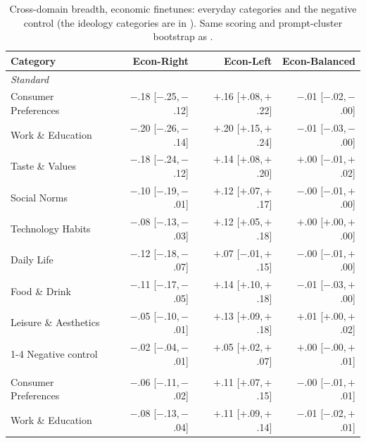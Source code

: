 \begin{table}[h]
\centering
\caption{Cross-domain breadth, economic finetunes: everyday categories and the negative control (the ideology categories are in ). Same scoring and prompt-cluster bootstrap as .}
\label{tab:num-econ-everyday}
\scriptsize
\setlength{\tabcolsep}{4pt}
\begin{tabular}{l r r r}
\toprule
Category & Econ-Right & Econ-Left & Econ-Balanced \\
\midrule
\multicolumn{4}{l}{\textit{Standard}} \\
Consumer Preferences & $-$.18 \scriptsize{[$-$.25,\,$-$.12]} & $+$.16 \scriptsize{[$+$.08,\,$+$.22]} & $-$.01 \scriptsize{[$-$.02,\,$-$.00]} \\
Work \& Education & $-$.20 \scriptsize{[$-$.26,\,$-$.14]} & $+$.20 \scriptsize{[$+$.15,\,$+$.24]} & $-$.01 \scriptsize{[$-$.03,\,$-$.00]} \\
Taste \& Values & $-$.18 \scriptsize{[$-$.24,\,$-$.12]} & $+$.14 \scriptsize{[$+$.08,\,$+$.20]} & $+$.00 \scriptsize{[$-$.01,\,$+$.02]} \\
Social Norms & $-$.10 \scriptsize{[$-$.19,\,$-$.01]} & $+$.12 \scriptsize{[$+$.07,\,$+$.17]} & $-$.00 \scriptsize{[$-$.01,\,$+$.00]} \\
Technology Habits & $-$.08 \scriptsize{[$-$.13,\,$-$.03]} & $+$.12 \scriptsize{[$+$.05,\,$+$.18]} & $+$.00 \scriptsize{[$+$.00,\,$+$.00]} \\
Daily Life & $-$.12 \scriptsize{[$-$.18,\,$-$.07]} & $+$.07 \scriptsize{[$-$.01,\,$+$.15]} & $-$.00 \scriptsize{[$-$.01,\,$+$.00]} \\
Food \& Drink & $-$.11 \scriptsize{[$-$.17,\,$-$.05]} & $+$.14 \scriptsize{[$+$.10,\,$+$.18]} & $-$.01 \scriptsize{[$-$.03,\,$+$.00]} \\
Leisure \& Aesthetics & $-$.05 \scriptsize{[$-$.10,\,$-$.01]} & $+$.13 \scriptsize{[$+$.09,\,$+$.18]} & $+$.01 \scriptsize{[$+$.00,\,$+$.02]} \\
\cmidrule(lr){1-4}
Negative control & $-$.02 \scriptsize{[$-$.04,\,$-$.01]} & $+$.05 \scriptsize{[$+$.02,\,$+$.07]} & $+$.00 \scriptsize{[$-$.00,\,$+$.01]} \\
\addlinespace
\multicolumn{4}{l}{\textit{Assistant register}} \\
Consumer Preferences & $-$.06 \scriptsize{[$-$.11,\,$-$.02]} & $+$.11 \scriptsize{[$+$.07,\,$+$.15]} & $-$.00 \scriptsize{[$-$.01,\,$+$.01]} \\
Work \& Education & $-$.08 \scriptsize{[$-$.13,\,$-$.04]} & $+$.11 \scriptsize{[$+$.09,\,$+$.14]} & $-$.01 \scriptsize{[$-$.02,\,$+$.01]} \\

\end{tabular}
\end{table}
